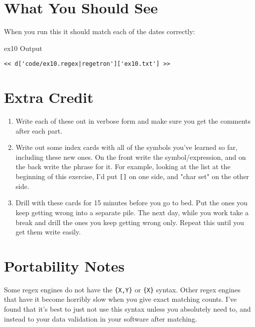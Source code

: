 \section{What You Should See}

When you run this it should match each of the dates correctly:

\begin{code}{ex10 Output}
\begin{Verbatim}
<< d['code/ex10.regex|regetron']['ex10.txt'] >>
\end{Verbatim}
\end{code}


\section{Extra Credit}

\begin{enumerate}
\item Write each of these out in verbose form and make sure you get the comments
    after each part.
\item Write out some index cards with all of the symbols you've learned so far,
    including these new ones.  On the front write the symbol/expression, and 
    on the back write the phrase for it.  For example, looking at the list
    at the beginning of this exercise, I'd put \verb|[]| on one side, and "char set"
    on the other side.
\item Drill with these cards for 15 minutes before you go to bed.  Put the ones
    you keep getting wrong into a separate pile.  The next day, while you work
    take a break and drill the ones you keep getting wrong only.  Repeat this
    until you get them write easily.
\end{enumerate}

\section{Portability Notes}

Some regex engines do not have the \verb|{X,Y}| or \verb|{X}| syntax. Other
regex engines that have it become horribly slow when you give exact matching
counts.  I've found that it's best to just not use this syntax unless you
absolutely need to, and instead to your data validation in your software
after matching.


